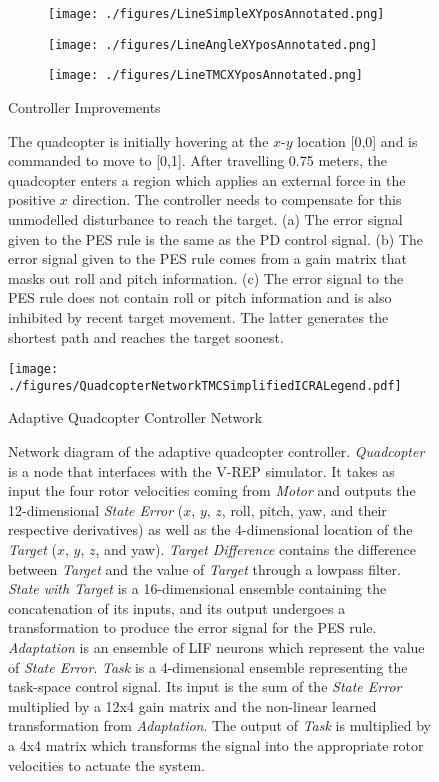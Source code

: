 \documentclass[letterpaper, 10 pt, conference]{ieeeconf}  %
\begin{document}
\begin{figure}
\centering
\begin{subfigure}[t]{0.15\textwidth}
\texttt{[image: ./figures/LineSimpleXYposAnnotated.png]}
\caption{}
\label{fig:ImprovementComparisonA}
\end{subfigure}
\begin{subfigure}[t]{0.15\textwidth}
\texttt{[image: ./figures/LineAngleXYposAnnotated.png]}
\caption{}
\label{fig:ImprovementComparisonB}
\end{subfigure}
\begin{subfigure}[t]{0.15\textwidth}
\texttt{[image: ./figures/LineTMCXYposAnnotated.png]}
\caption{}
\label{fig:ImprovementComparisonC}
\end{subfigure}
\caption{Controller Improvements}
\label{fig:ImprovementComparison}
\captionsetup{singlelinecheck=off,font=footnotesize}
\caption*{The quadcopter is initially hovering at the $x$-$y$ location [0,0] and is commanded to move to [0,1]. After travelling 0.75 meters, the quadcopter enters a region which applies an external force in the positive $x$ direction. The controller needs to compensate for this unmodelled disturbance to reach the target. (a) The error signal given to the PES rule is the same as the PD control signal. (b) The error signal given to the PES rule comes from a gain matrix that masks out roll and pitch information. (c) The error signal to the PES rule does not contain roll or pitch information and is also inhibited by recent target movement. The latter generates the shortest path and reaches the target soonest.}
\end{figure}

\begin{figure}
\centering
\texttt{[image: ./figures/QuadcopterNetworkTMCSimplifiedICRALegend.pdf]}
\caption{Adaptive Quadcopter Controller Network}
\label{fig:NetFinal}
\captionsetup{singlelinecheck=off,font=footnotesize}
\caption*{Network diagram of the adaptive quadcopter controller. \textit{Quadcopter} is a node that interfaces with the V-REP simulator. It takes as input the four rotor velocities coming from \textit{Motor} and outputs the 12-dimensional \textit{State Error} ($x$, $y$, $z$, roll, pitch, yaw, and their respective derivatives) as well as the 4-dimensional location of the \textit{Target} ($x$, $y$, $z$, and yaw). \textit{Target Difference} contains the difference between \textit{Target} and the value of \textit{Target} through a lowpass filter. \textit{State with Target} is a 16-dimensional ensemble containing the concatenation of its inputs, and its output undergoes a transformation to produce the error signal for the PES rule. \textit{Adaptation} is an ensemble of LIF neurons which represent the value of \textit{State Error}. \textit{Task} is a 4-dimensional ensemble representing the task-space control signal. Its input is the sum of the \textit{State Error} multiplied by a 12x4 gain matrix and the non-linear learned transformation from \textit{Adaptation}. The output of \textit{Task} is multiplied by a 4x4 matrix which transforms the signal into the appropriate rotor velocities to actuate the system.}
\end{figure}
\end{document}
